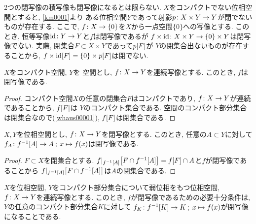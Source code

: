 \documentclass[uplatex, dvipdfmx, a4paper, 12pt, class=jsbook, crop=false]{standalone}
\begin{document}
\begin{example}
	2つの閉写像の積写像も閉写像になるとは限らない.
	$ X $をコンパクトでない位相空間とすると, \cref{km0001}より
	ある位相空間$ Y $であって射影$ p\colon X \times Y\to Y $が閉でないものが存在する.
	ここで, $ f\colon X\to\{0\} $を$ X $から一点空間$ \{0\} $への写像とする.
	このとき, 恒等写像$ \mathrm{id}\colon Y\to Y $と$ f $は閉写像であるが
	$ f \times \mathrm{id}\colon X \times Y\to\{0\} \times Y $は閉写像でない.
	実際, 閉集合$ F \subset X \times Y $であって$ \mapset{p}{F} $が
	$ Y $の閉集合出ないものが存在することから,
	$ \mapset{f \times \identity}{F} = \lrbrace{0} \times \mapset{p}{F} $は閉でない.
\end{example}

\begin{proposition}
	$ X $をコンパクト空間, $ Y $を \Hausdorff 空間とし, $ f\colon X\to Y $を連続写像とする.
	このとき, $ f $は閉写像である.
\end{proposition}

\begin{proof}
	コンパクト空間$ X $の任意の閉集合$ F $はコンパクトであり,
	$ f\colon X\to Y $が連続であることから, $ \mapset{f}{F} $は
	$ Y $のコンパクト集合である.
	\Hausdorff 空間のコンパクト部分集合は閉集合なので(\cref{whaus00001}),
	$ \mapset{f}{F} $は閉集合である.
\end{proof}

\begin{proposition}
	\label{c00002}
	$ X, Y $を位相空間とし, $ f\colon X\to Y $を閉写像とする.
	このとき, 任意の$ A \subset Y $に対して
	$ \morphto{f_A}{\mapinvset{f}{A}}{A}{x}{f(x)} $は閉写像である.
\end{proposition}

\begin{proof}
	$ F \subset X $を閉集合とする.
	$ \mapset{f|_{\mapinvset{f}{A}}}{F \cap \mapinvset{f}{A}}
	= \mapset{f}{F} \cap A $と$ f $が閉写像であることから
	$ \mapset{f|_{\mapinvset{f}{A}}}{F \cap \mapinvset{f}{A}} $は$ A $の閉集合である.
\end{proof}

\begin{proposition}
	$ X $を位相空間, $ Y $をコンパクト部分集合について弱位相をもつ位相空間,
	$ f\colon X\to Y $を連続写像とする.
	このとき, $ f $が閉写像であるための必要十分条件は, $ Y $の任意のコンパクト部分集合$ K $に対して
	$ \morphto{f_K}{\mapinvset{f}{K}}{K}{x}{f(x)} $が閉写像になることである.
\end{proposition}
\end{document}
